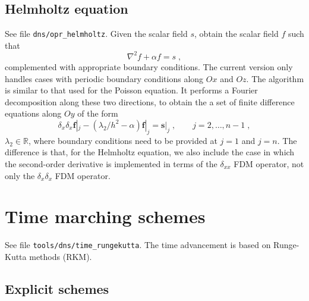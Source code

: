 {\subsection{Helmholtz equation}
\label{sec:helmholtz}

See file {\tt dns/opr\_helmholtz}. Given the scalar field $s$, obtain the scalar field $f$ such that
\begin{equation}
\nabla^2 f + \alpha f= s \;,
\end{equation}
complemented with appropriate boundary conditions. The current version only handles cases with periodic boundary conditions along $Ox$ and $Oz$. The algorithm is similar to that used for the Poisson equation. It performs a Fourier decomposition along these two directions, to obtain the a set of finite difference equations along $Oy$ of the form
\begin{equation}
  \delta_x \delta_x \mathbf{f}|_j - (\lambda_2/h^2-\alpha)\mathbf{f}|_j=\mathbf{s}|_j
  \;,\qquad j=2,\ldots,n-1 \;,
\end{equation}
$\lambda_2\in\mathbb{R}$, where boundary conditions need to be provided at $j=1$ and $j=n$. The difference is that, for the Helmholtz equation, we also include the case in which the second-order derivative is implemented in terms of the $\delta_{xx}$ FDM operator, not only the $\delta_x\delta_x$ FDM operator.

\section{Time marching schemes}

See file {\tt tools/dns/time\_rungekutta}. The time advancement is based on
Runge-Kutta methods (RKM).

\subsection{Explicit schemes}

}

